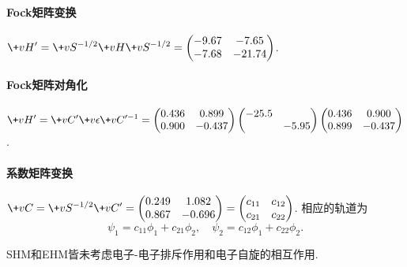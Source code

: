 \documentclass[hidelinks]{ctexart}
\begin{document}
\paragraph{Fock矩阵变换} %
\label{par:fock矩阵变换}

$\displaystyle \+vH' = \+vS^{-1/2}\+vH\+vS^{-1/2} = \begin{pmatrix}
    -9.67 & -7.65 \\
    -7.68 & -21.74
\end{pmatrix}$.


\paragraph{Fock矩阵对角化} %
\label{par:fock矩阵对角化}

$\displaystyle \+vH' = \+vC' \+v\epsilon \+vC'^{-1} = \begin{pmatrix}
    0.436 & 0.899 \\
    0.900 & -0.437
\end{pmatrix}\begin{pmatrix}
    -25.5 \\
    & -5.95
\end{pmatrix}\begin{pmatrix}
    0.436 & 0.900 \\
    0.899 & -0.437
\end{pmatrix}$.


\paragraph{系数矩阵变换} %
\label{par:系数矩阵变换}

$\displaystyle \+vC = \+vS^{-1/2} \+vC' = \begin{pmatrix}
    0.249 & 1.082 \\
    0.867 & -0.696
\end{pmatrix} = \begin{pmatrix}
    c_{11} & c_{12} \\
    c_{21} & c_{22}
\end{pmatrix}$. 相应的轨道为
\[ \psi_1 = c_{11}\phi_1 + c_{21}\phi_2,\quad \psi_2 = c_{12}\phi_1 + c_{22}\phi_2. \]

\begin{pitfall}
    SHM和EHM皆未考虑电子-电子排斥作用和电子自旋的相互作用.
\end{pitfall}




\end{document}
